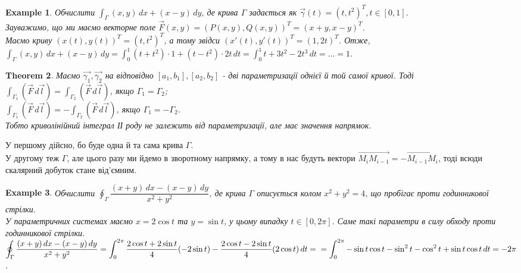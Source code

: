 \documentclass[a4paper, 10pt]{article}
\theoremstyle{theoremdd}
\newtheorem{theorem}{Theorem}[subsection]
\theoremstyle{theoremdd}
\theoremstyle{theoremdd}
\theoremstyle{theoremdd}
\theoremstyle{theoremdd}
\newtheorem{example}[theorem]{Example}
\theoremstyle{theoremdd}
\theoremstyle{theoremdd}
\theoremstyle{theoremdd}
\theoremstyle{theoremdd}
\theoremstyle{theoremdd}
\theoremstyle{theoremdd}
\theoremstyle{theoremdd}
\theoremstyle{theoremdd}
\theoremstyle{theoremdd}
\theoremstyle{theoremdd}
\begin{document}
\begin{example}
Обчислити $\displaystyle\int_\Gamma (x,y)\,dx + (x-y)\,dy$, де крива $\Gamma$ задається як $\vec{\gamma}(t) = (t,t^2)^T, t \in [0,1]$.\\
Зауважимо, що ми маємо векторне поле $\vec{F}(x,y) = (P(x,y),Q(x,y))^T = (x+y,x-y)^T$.\\
Маємо криву $(x(t),y(t))^T = (t,t^2)^T$, а тому звідси $(x'(t),y'(t))^T = (1,2t)^T$. Отже,\\
$\displaystyle\int_\Gamma (x,y)\,dx + (x-y)\,dy = \int_0^1 (t+t^2) \cdot 1 + (t-t^2) \cdot 2t\,dt = \int_0^1 t+3t^2-2t^3\,dt = \dots = 1$.
\end{example}

\begin{theorem}
Маємо $\vec{\gamma_1},\vec{\gamma_2}$ на відповідно $[a_1,b_1], [a_2,b_2]$ - дві параметризації однієї й той самої кривої. Тоді\\
$\displaystyle\int_{\Gamma_1} (\vec{F}\,d\vec{l}) = \int_{\Gamma_2} (\vec{F}\,d\vec{l})$, якщо $\Gamma_1 = \Gamma_2$;\\
$\displaystyle\int_{\Gamma_1 } (\vec{F}\,d\vec{l}) = -\int_{\Gamma_2} (\vec{F}\,d\vec{l})$, якщо $\Gamma_1 = -\Gamma_2$.\\
Тобто криволінійний інтеграл ІІ роду не залежить від параметризації, але має значення напрямок.
\end{theorem}

У першому дійсно, бо буде одна й та сама крива $\Gamma$.\\
У другому теж $\Gamma$, але цього разу ми йдемо в зворотному напрямку, а тому в нас будуть вектори $\overrightarrow{M_{i}M_{i-1}} = -\overrightarrow{M_{i-1}M_i}$, тоді всюди скалярний добуток стане від'ємним.

\begin{example}
Обчислити $\displaystyle\oint_\Gamma \dfrac{(x+y)\,dx - (x-y)\,dy}{x^2+y^2}$, де крива $\Gamma$ описується колом $x^2+y^2 = 4$, що пробігає проти годинникової стрілки.\\
У параметричних системах маємо $x = 2 \cos t$ та $y = \sin t$, у цьому випадку $t \in [0,2\pi]$. Саме такі параметри в силу обходу проти годинникової стрілки.\\
$\displaystyle\oint_\Gamma \dfrac{(x+y)\,dx - (x-y)\,dy}{x^2+y^2} = \int_0^{2\pi} \dfrac{2 \cos t + 2 \sin t}{4} (-2\sin t) - \dfrac{2 \cos t - 2 \sin t}{4} (2 \cos t)\,dt = \\
= \int_{0}^{2\pi} -\sin t \cos t - \sin^2 t - \cos^2 t + \sin t \cos t\,dt = -2\pi$.
\end{example}
\end{document}
